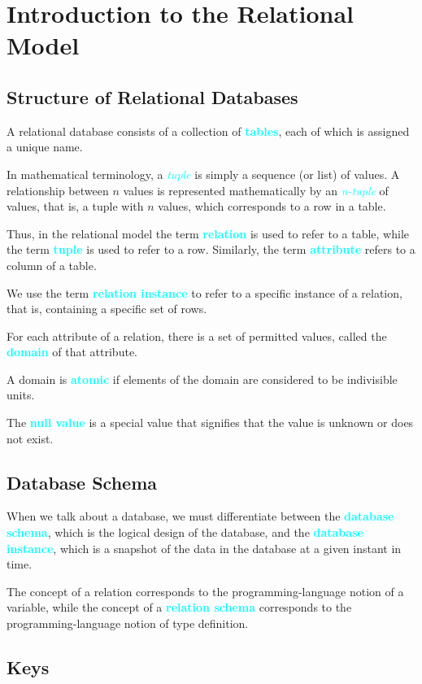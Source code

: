 \documentclass{Beautybook-EN}
\newcommand{\textcy}[1]{\textbf{\textcolor{cyan}{#1}}}
\newcommand{\textcyi}[1]{\textit{\textcolor{cyan}{#1}}}
\begin{document}
\chapter{Introduction to the Relational Model}
\section{Structure of Relational Databases}

A relational database consists of a collection of \textcy{tables}, each of which is assigned a unique name.

In mathematical terminology, a \textcyi{tuple} is simply a sequence (or list) of values. A relationship between $n$ values is represented mathematically by an \textcyi{n-tuple} of values, that is, a tuple with $n$ values, which corresponds to a row in a table.

Thus, in the relational model the term \textcy{relation} is used to refer to a table, while the term \textcy{tuple} is used to refer to a row. Similarly, the term \textcy{attribute} refers to a column of a table.

We use the term \textcy{relation instance} to refer to a specific instance of a relation, that is, containing a specific set of rows.

For each attribute of a relation, there is a set of permitted values, called the \textcy{domain} of that attribute.

A domain is \textcy{atomic} if elements of the domain are considered to be indivisible units.

The \textcy{null value} is a special value that signifies that the value is unknown or does not exist.

\section{Database Schema}

When we talk about a database, we must differentiate between the \textcy{database schema}, which is the logical design of the database, and the \textcy{database instance}, which is a snapshot of the data in the database at a given instant in time.

The concept of a relation corresponds to the programming-language notion of a variable, while the concept of a \textcy{relation schema} corresponds to the programming-language notion of type definition.

\section{Keys}
\end{document}
